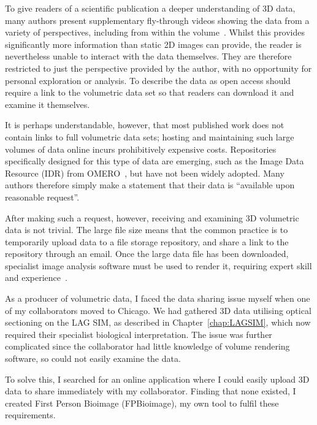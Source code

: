 To give readers of a scientific publication a deeper understanding of 3D data, many authors present supplementary fly-through videos showing the data from a variety of perspectives, including from within the volume~\cite{huang2016ultra, legant2016high, fu2016imaging, chhetri2015whole}.
Whilst this provides significantly more information than static 2D images can provide, the reader is nevertheless unable to interact with the data themselves.
They are therefore restricted to just the perspective provided by the author, with no opportunity for personal exploration or analysis.
To describe the data as open access should require a link to the volumetric data set so that readers can download it and examine it themselves.

It is perhaps understandable, however, that most published work does not contain links to full volumetric data sets; hosting and maintaining such large volumes of data online incurs prohibitively expensive costs.
Repositories specifically designed for this type of data are emerging, such as the Image Data Resource (IDR) from OMERO~\cite{williams2017image}, but have not been widely adopted.
Many authors therefore simply make a statement that their data is ``available upon reasonable request''.

After making such a request, however, receiving and examining 3D volumetric data is not trivial.
The large file size means that the common practice is to temporarily upload data to a file storage repository, and share a link to the repository through an email.
Once the large data file has been downloaded, specialist image analysis software must be used to render it, requiring expert skill and experience~\cite{broeke2015image}.

As a producer of volumetric data, I faced the data sharing issue myself when one of my collaborators moved to Chicago.
We had gathered 3D data utilising optical sectioning on the LAG SIM, as described in Chapter~\ref{chap:LAGSIM}, which now required their specialist biological interpretation.
The issue was further complicated since the collaborator had little knowledge of volume rendering software, so could not easily examine the data.

To solve this, I searched for an online application where I could easily upload 3D data to share immediately with my collaborator.
Finding that none existed, I created First Person Bioimage (FPBioimage), my own tool to fulfil these requirements.

